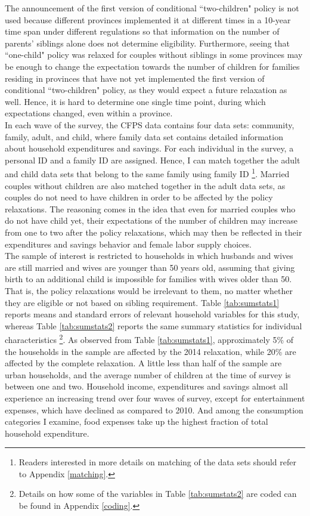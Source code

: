 \documentclass[12pt]{extarticle}
\begin{document}
\indent The announcement of the first version of conditional ``two-children" policy is not used because different provinces implemented it at different times in a 10-year time span under different regulations so that information on the number of parents' siblings alone does not determine eligibility. Furthermore, seeing that ``one-child" policy was relaxed for couples without siblings in some provinces may be enough to change the expectation towards the number of children for families residing in provinces that have not yet implemented the first version of conditional ``two-children" policy, as they would expect a future relaxation as well. Hence, it is hard to determine one single time point, during which expectations changed, even within a province. \\
\indent In each wave of the survey, the CFPS data contains four data sets: community, family, adult, and child, where family data set contains detailed information about household expenditures and savings. For each individual in the survey, a personal ID and a family ID are assigned. Hence, I can match together the adult and child data sets that belong to the same family using family ID \footnote{Readers interested in more details on matching of the data sets should refer to Appendix \ref{matching}.}. Married couples without children are also matched together in the adult data sets, as couples do not need to have children in order to be affected by the policy relaxations. The reasoning comes in the idea that even for married couples who do not have child yet, their expectations of the number of children may increase from one to two after the policy relaxations, which may then be reflected in their expenditures and savings behavior and female labor supply choices. \\
\indent The sample of interest is restricted to households in which husbands and wives are still married and wives are younger than 50 years old, assuming that giving birth to an additional child is impossible for families with wives older than 50. That is, the policy relaxations would be irrelevant to them, no matter whether they are eligible or not based on sibling requirement. Table \ref{tab:sumstats1} reports means and standard errors of relevant household variables for this study, whereas Table \ref{tab:sumstats2} reports the same summary statistics for individual characteristics \footnote{Details on how some of the variables in Table \ref{tab:sumstats2} are coded can be found in Appendix \ref{coding}.}. As observed from Table \ref{tab:sumstats1}, approximately 5\% of the households in the sample are affected by the 2014 relaxation, while 20\% are affected by the complete relaxation. A little less than half of the sample are urban households, and the average number of children at the time of survey is between one and two. Household income, expenditures and savings almost all experience an increasing trend over four waves of survey, except for entertainment expenses, which have declined as compared to 2010. And among the consumption categories I examine, food expenses take up the highest fraction of total household expenditure.
\end{document}
